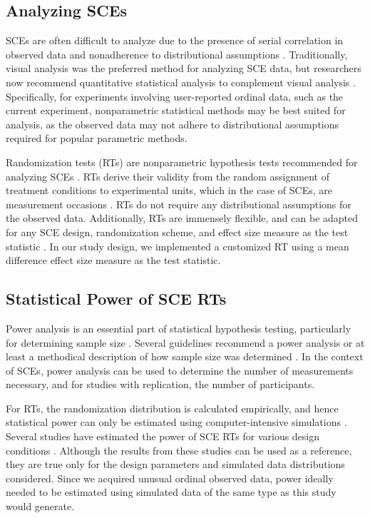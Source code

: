 \documentclass{article}
\begin{document}
\subsection{Analyzing SCEs} 

SCEs are often difficult to analyze due to the presence of serial correlation in observed data and nonadherence to distributional assumptions \autocite{bib20} \autocite{bib21} \autocite{bib22} \autocite{bib23}. Traditionally, visual analysis was the preferred method for analyzing SCE data, but researchers now recommend quantitative statistical analysis to complement visual analysis \autocite{bib24} \autocite{bib25} \autocite{bib26} \autocite{bib27} \autocite{bib28}. Specifically, for experiments involving user-reported ordinal data, such as the current experiment, nonparametric statistical methods may be best suited for analysis, as the observed data may not adhere to distributional assumptions required for popular parametric methods. 

Randomization tests (RTs) are nonparametric hypothesis tests recommended for analyzing SCEs \autocite{bib14} \autocite{bib22} \autocite{bib11}. RTs derive their validity from the random assignment of treatment conditions to experimental units, which in the case of SCEs, are measurement occasions \autocite{bib29}. RTs do not require any distributional assumptions for the observed data. Additionally, RTs are immensely flexible, and can be adapted for any SCE design, randomization scheme, and effect size measure as the test statistic \autocite{bib30} \autocite{bib31} \autocite{bib11}. In our study design, we implemented a customized RT using a mean difference effect size measure as the test statistic. 

\subsection{Statistical Power of SCE RTs }

Power analysis is an essential part of statistical hypothesis testing, particularly for determining sample size \autocite{bib32}. Several guidelines recommend a power analysis or at least a methodical description of how sample size was determined \autocite{bib33} \autocite{bib34}. In the context of SCEs, power analysis can be used to determine the number of measurements necessary, and for studies with replication, the number of participants.

For RTs, the randomization distribution is calculated empirically, and hence statistical power can only be estimated using computer-intensive simulations \autocite{bib35} \autocite{bib18}. Several studies have estimated the power of SCE RTs for various design conditions \autocite{bib19} \autocite{bib18} \autocite{bib36} \autocite{bib37} \autocite{bib38} \autocite{bib39}. Although the results from these studies can be used as a reference, they are true only for the design parameters and simulated data distributions considered. Since we acquired unusual ordinal observed data, power ideally needed to be estimated using simulated data of the same type as this study would generate.
\end{document}
